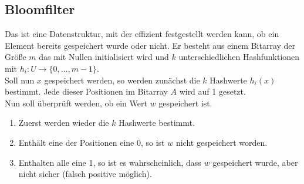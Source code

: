 \documentclass[a4paper, 12pt]{article}
\begin{document}
	\subsection{Bloomfilter}
	Das ist eine Datenstruktur, mit der effizient festgestellt werden kann, ob ein Element bereits gespeichert wurde oder nicht. Er besteht aus einem Bitarray der Größe $m$ das mit Nullen initialisiert wird und $k$ unterschiedlichen Hashfunktionen mit $h_i: U \to \{0,...,m-1\}$.\\
	Soll nun $x$ gespeichert werden, so werden zunächst die $k$ Hashwerte $h_i(x)$ bestimmt. Jede dieser Positionen im Bitarray $A$ wird auf 1 gesetzt.\\
	Nun soll überprüft werden, ob ein Wert $w$ gespeichert ist. \begin{enumerate}
		\item Zuerst werden wieder die $k$ Hashwerte bestimmt.
		\item Enthält eine der Positionen eine 0, so ist $w$ nicht gespeichert worden.
		\item Enthalten alle eine 1, so ist es wahrscheinlich, dass $w$ gespeichert wurde, aber nicht sicher (falsch positive möglich). 
	\end{enumerate} 
\end{document}
